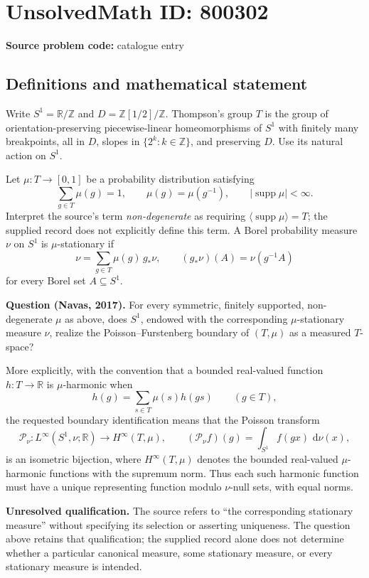 \documentclass[11pt]{article}
\newcommand{\Z}{\mathbb{Z}}
\newcommand{\R}{\mathbb{R}}
\newcommand{\dd}{\,\mathrm{d}}
\begin{document}
\section*{UnsolvedMath ID: 800302}
\textbf{Source problem code:} catalogue entry
\subsection{Definitions and mathematical statement}
Write \(S^1=\R/\Z\) and \(D=\Z[1/2]/\Z\). Thompson's group \(T\) is the group of orientation-preserving piecewise-linear homeomorphisms of \(S^1\) with finitely many breakpoints, all in \(D\), slopes in \(\{2^k:k\in\Z\}\), and preserving \(D\). Use its natural action on \(S^1\).

Let \(\mu:T\to[0,1]\) be a probability distribution satisfying
\[
\sum_{g\in T}\mu(g)=1,\qquad
\mu(g)=\mu(g^{-1}),\qquad
|\operatorname{supp}\mu|<\infty.
\]
Interpret the source's term \emph{non-degenerate} as requiring \(\langle\operatorname{supp}\mu\rangle=T\); the supplied record does not explicitly define this term. A Borel probability measure \(\nu\) on \(S^1\) is \(\mu\)-stationary if
\[
\nu=\sum_{g\in T}\mu(g)\,g_*\nu,
\qquad (g_*\nu)(A)=\nu(g^{-1}A)
\]
for every Borel set \(A\subseteq S^1\).

\textbf{Question (Navas, 2017).} For every symmetric, finitely supported, non-degenerate \(\mu\) as above, does \(S^1\), endowed with the corresponding \(\mu\)-stationary measure \(\nu\), realize the Poisson--Furstenberg boundary of \((T,\mu)\) as a measured \(T\)-space?

More explicitly, with the convention that a bounded real-valued function \(h:T\to\R\) is \(\mu\)-harmonic when
\[
h(g)=\sum_{s\in T}\mu(s)h(gs)\qquad(g\in T),
\]
the requested boundary identification means that the Poisson transform
\[
\mathcal P_\nu:L^\infty(S^1,\nu;\R)\longrightarrow H^\infty(T,\mu),
\qquad
(\mathcal P_\nu f)(g)=\int_{S^1}f(gx)\,\dd\nu(x),
\]
is an isometric bijection, where \(H^\infty(T,\mu)\) denotes the bounded real-valued \(\mu\)-harmonic functions with the supremum norm. Thus each such harmonic function must have a unique representing function modulo \(\nu\)-null sets, with equal norms.

\textbf{Unresolved qualification.} The source refers to ``the corresponding stationary measure'' without specifying its selection or asserting uniqueness. The question above retains that qualification; the supplied record alone does not determine whether a particular canonical measure, some stationary measure, or every stationary measure is intended.
\end{document}
